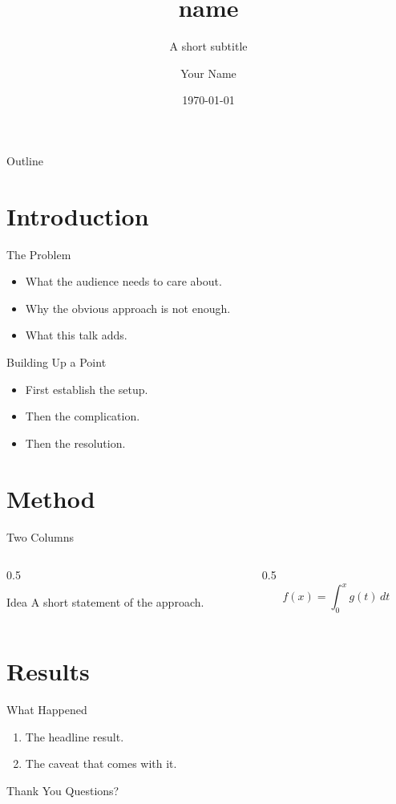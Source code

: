 \documentclass[aspectratio=169]{beamer}
\title{{name}}
\subtitle{A short subtitle}
\author{Your Name}
\institute{Your Institution}
\date{\today}
\begin{document}
\begin{frame}
    \titlepage
\end{frame}

\begin{frame}{Outline}
    \tableofcontents
\end{frame}

\section{Introduction}

\begin{frame}{The Problem}
    \begin{itemize}
        \item What the audience needs to care about.
        \item Why the obvious approach is not enough.
        \item What this talk adds.
    \end{itemize}
\end{frame}

\begin{frame}{Building Up a Point}
    \begin{itemize}
        \item<1-> First establish the setup.
        \item<2-> Then the complication.
        \item<3-> Then the resolution.
    \end{itemize}
\end{frame}

\section{Method}

\begin{frame}{Two Columns}
    \begin{columns}
        \begin{column}{0.5\textwidth}
            \begin{block}{Idea}
                A short statement of the approach.
            \end{block}
        \end{column}
        \begin{column}{0.5\textwidth}
            \begin{equation*}
                f(x) = \int_{0}^{x} g(t)\,dt
            \end{equation*}
        \end{column}
    \end{columns}
\end{frame}

\section{Results}

\begin{frame}{What Happened}
    \begin{enumerate}
        \item The headline result.
        \item The caveat that comes with it.
    \end{enumerate}
\end{frame}

\begin{frame}{Thank You}
    \centering
    \Large Questions?
\end{frame}
\end{document}
